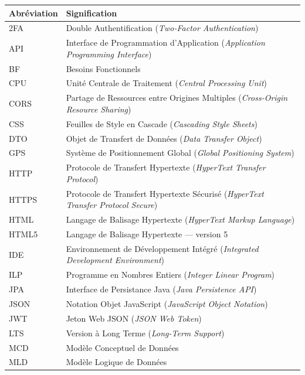 \documentclass[12pt,a4paper]{report}
\begin{document}
    
	\begin{longtable}{p{3.5cm} p{10.5cm}}
		\toprule
		\textbf{Abréviation} & \textbf{Signification} \\
		\toprule
		\endhead
		2FA       & Double Authentification (\textit{Two-Factor Authentication}) \\[4pt]
		API       & Interface de Programmation d'Application (\textit{Application Programming Interface}) \\[4pt]
		BF        & Besoins Fonctionnels \\[4pt]
		CPU       & Unité Centrale de Traitement (\textit{Central Processing Unit}) \\[4pt]
		CORS      & Partage de Ressources entre Origines Multiples (\textit{Cross-Origin Resource Sharing}) \\[4pt]
		CSS       & Feuilles de Style en Cascade (\textit{Cascading Style Sheets}) \\[4pt]
		DTO       & Objet de Transfert de Données (\textit{Data Transfer Object}) \\[4pt]
		GPS       & Système de Positionnement Global (\textit{Global Positioning System}) \\[4pt]
		HTTP      & Protocole de Transfert Hypertexte (\textit{HyperText Transfer Protocol}) \\[4pt]
		HTTPS     & Protocole de Transfert Hypertexte Sécurisé (\textit{HyperText Transfer Protocol Secure}) \\[4pt]
		HTML      & Langage de Balisage Hypertexte (\textit{HyperText Markup Language}) \\[4pt]
		HTML5     & Langage de Balisage Hypertexte --- version 5 \\[4pt]
		IDE       & Environnement de Développement Intégré (\textit{Integrated Development Environment}) \\[4pt]
		ILP       & Programme en Nombres Entiers (\textit{Integer Linear Program}) \\[4pt]
		JPA       & Interface de Persistance Java (\textit{Java Persistence API}) \\[4pt]
		JSON      & Notation Objet JavaScript (\textit{JavaScript Object Notation}) \\[4pt]
		JWT       & Jeton Web JSON (\textit{JSON Web Token}) \\[4pt]
		LTS       & Version à Long Terme (\textit{Long-Term Support}) \\[4pt]
		MCD       & Modèle Conceptuel de Données \\[4pt]
		MLD       & Modèle Logique de Données \\[4pt]

\end{longtable}
\end{document}
